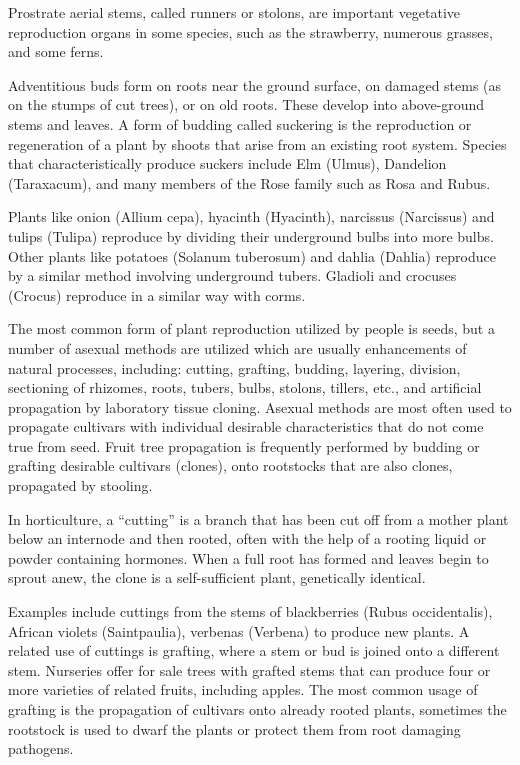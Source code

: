 Prostrate aerial stems, called runners or stolons, are important vegetative reproduction organs in some species, such as the strawberry, numerous grasses, and some ferns.

Adventitious buds form on roots near the ground surface, on damaged stems (as on the stumps of cut trees), or on old roots. These develop into above-ground stems and leaves. A form of budding called suckering is the reproduction or regeneration of a plant by shoots that arise from an existing root system. Species that characteristically produce suckers include Elm (Ulmus), Dandelion (Taraxacum), and many members of the Rose family such as Rosa and Rubus.

Plants like onion (Allium cepa), hyacinth (Hyacinth), narcissus (Narcissus) and tulips (Tulipa) reproduce by dividing their underground bulbs into more bulbs. Other plants like potatoes (Solanum tuberosum) and dahlia (Dahlia) reproduce by a similar method involving underground tubers. Gladioli and crocuses (Crocus) reproduce in a similar way with corms.

The most common form of plant reproduction utilized by people is seeds, but a number of asexual methods are utilized which are usually enhancements of natural processes, including: cutting, grafting, budding, layering, division, sectioning of rhizomes, roots, tubers, bulbs, stolons, tillers, etc., and artificial propagation by laboratory tissue cloning. Asexual methods are most often used to propagate cultivars with individual desirable characteristics that do not come true from seed. Fruit tree propagation is frequently performed by budding or grafting desirable cultivars (clones), onto rootstocks that are also clones, propagated by stooling.

In horticulture, a ``cutting'' is a branch that has been cut off from a mother plant below an internode and then rooted, often with the help of a rooting liquid or powder containing hormones. When a full root has formed and leaves begin to sprout anew, the clone is a self-sufficient plant, genetically identical.

Examples include cuttings from the stems of blackberries (Rubus occidentalis), African violets (Saintpaulia), verbenas (Verbena) to produce new plants. A related use of cuttings is grafting, where a stem or bud is joined onto a different stem. Nurseries offer for sale trees with grafted stems that can produce four or more varieties of related fruits, including apples. The most common usage of grafting is the propagation of cultivars onto already rooted plants, sometimes the rootstock is used to dwarf the plants or protect them from root damaging pathogens.

